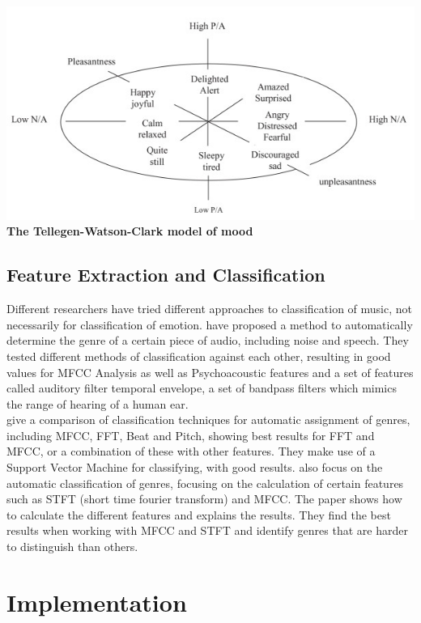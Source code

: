 \begin{multicols}{2}
\begin{Figure}
	\label{tellegen-nwatson-clark}
	\includegraphics[width=\linewidth]{images/tellegen-watson-clark-model.jpg}
	\centering
	\textbf{The Tellegen-Watson-Clark model of mood} \citep{Tellegen1999}
\end{Figure}

\subsection{Feature Extraction and Classification}
Different researchers have tried different approaches to classification of music, not necessarily for classification of emotion. \citet{Mckinney2003} have proposed a method to automatically determine the genre of a certain piece of audio, including noise and speech. They tested different methods of classification against each other, resulting in good values for MFCC Analysis as well as Psychoacoustic features and a set of features called auditory filter temporal envelope, a set of bandpass filters which mimics the range of hearing of a human ear.\\

\citet{Li2003} give a comparison of classification techniques for automatic assignment of genres, including MFCC, FFT, Beat and Pitch, showing best results for FFT and MFCC, or a combination of these with other features. They make use of a Support Vector Machine for classifying, with good results.
\citet{Tzanetakis2001} also focus on the automatic classification of genres, focusing on the calculation of certain features such as STFT (short time fourier transform) and MFCC. The paper shows how to calculate the different features and explains the results. They find the best results when working with MFCC and STFT and identify genres that are harder to distinguish than others.

\section{Implementation}

\end{multicols}
